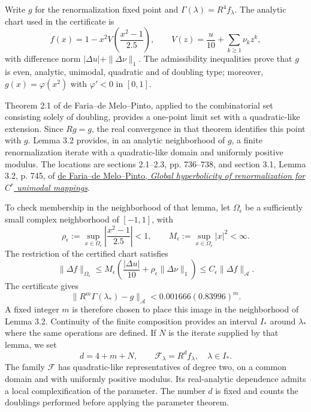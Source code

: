 Write \(g\) for the renormalization fixed point and
\(\Gamma(\lambda)=R^4f_\lambda\). The analytic chart used in the certificate is
\[
f(x)=1-x^2V\!\left(\frac{x^2-1}{2.5}\right),\qquad
V(z)=\frac{u}{10}+\sum_{k\ge1}\nu_kz^k,
\]
with difference norm \(|\Delta u|+\|\Delta\nu\|_1\). The admissibility inequalities prove that \(g\) is even, analytic, unimodal, quadratic and of doubling type; moreover, \(g(x)=\varphi(x^2)\) with \(\varphi'<0\) in \([0,1]\).

Theorem 2.1 of de Faria–de Melo–Pinto, applied to the combinatorial set consisting solely of doubling, provides a one-point limit set with a quadratic-like extension. Since \(Rg=g\), the real convergence in that theorem identifies this point with \(g\). Lemma 3.2 provides, in an analytic neighborhood of \(g\), a finite renormalization iterate with a quadratic-like domain and uniformly positive modulus. The locations are sections 2.1–2.3, pp. 736–738, and section 3.1, Lemma 3.2, p. 745, of \href{https://annals.math.princeton.edu/wp-content/uploads/annals-v164-n3-p01.pdf}{de Faria–de Melo–Pinto, \emph{Global hyperbolicity of renormalization for \(C^r\) unimodal mappings}}.

To check membership in the neighborhood of that lemma, let \(\Omega_\epsilon\) be a sufficiently small complex neighborhood of \([-1,1]\), with
\[
\rho_\epsilon:=\sup_{x\in\Omega_\epsilon}
\left|\frac{x^2-1}{2.5}\right|<1,
\qquad M_\epsilon:=\sup_{x\in\Omega_\epsilon}|x|^2<\infty.
\]
The restriction of the certified chart satisfies
\begin{equation}
\|\Delta f\|_{\Omega_\epsilon}
\le M_\epsilon\left(\frac{|\Delta u|}{10}
          +\rho_\epsilon\|\Delta\nu\|_1\right)
\le C_\epsilon\|\Delta f\|_{\mathcal A}.
\label{hmtfg:clasificacion:eq:16}
\end{equation}
The certificate gives
\[
\|R^m\Gamma(\lambda_*)-g\|_{\mathcal A}
<0.001666(0.83996)^m.
\]
A fixed integer \(m\) is therefore chosen to place this image in the neighborhood of Lemma 3.2. Continuity of the finite composition provides an interval \(I_*\) around \(\lambda_*\) where the same operations are defined. If \(N\) is the iterate supplied by that lemma, we set
\begin{equation}
d=4+m+N,\qquad
\mathcal F_\lambda=R^df_\lambda,\quad \lambda\in I_*.
\label{hmtfg:clasificacion:eq:17}
\end{equation}
The family \(\mathcal F\) has quadratic-like representatives of degree two, on a common domain and with uniformly positive modulus. Its real-analytic dependence admits a local complexification of the parameter. The number \(d\) is fixed and counts the doublings performed before applying the parameter theorem.


